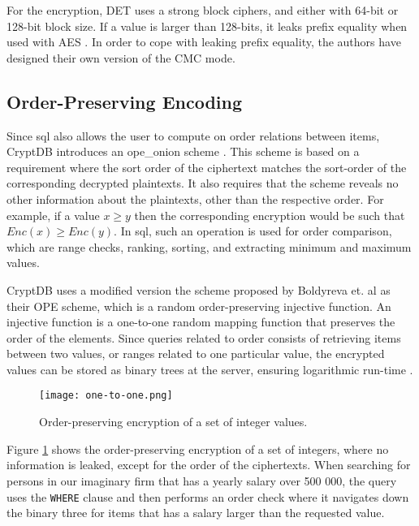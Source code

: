 \noindent
For the encryption, DET uses a strong block ciphers, and either with 64-bit or 128-bit block size. If a value is larger than 128-bits, it leaks  prefix equality when used with AES \citep{CryptDB_Main_Paper}. In order to cope with leaking prefix equality, the authors have designed their own version of the CMC mode.



\subsection{Order-Preserving Encoding}
\label{sec:ope}

Since \Gls{sql} also allows the user to compute on order relations between items, CryptDB introduces an \Gls{ope_onion} scheme \citep{CryptDB_Main_Paper}. This scheme is based on a requirement where the sort order of the ciphertext matches the sort-order of the corresponding decrypted plaintexts. It also requires that the scheme reveals no other information about the plaintexts, other than the respective order. For example, if a value $x \ge y$ then the corresponding encryption would be such that $Enc(x) \ge Enc(y)$. In \Gls{sql}, such an operation is used for order comparison, which are range checks, ranking, sorting, and extracting minimum and maximum values. 

CryptDB uses a modified version the scheme proposed by Boldyreva et. al \citep{ope_cryptdb} as their OPE scheme, which is a random order-preserving injective function. An injective function is a one-to-one random mapping function that preserves the order of the elements. Since queries related to order consists of retrieving items between two values, or ranges related to one particular value, the encrypted values can be stored as binary trees at the server, ensuring logarithmic run-time \cite{ope_cryptdb}.


\begin{figure}[h]
	\texttt{[image: one-to-one.png]}
	\caption{Order-preserving encryption of a set of integer values.}
	\label{fig:ope_function}
\end{figure}

Figure \ref{fig:ope_function} shows the order-preserving encryption of a set of integers, where no information is leaked, except for the order of the ciphertexts. When searching for persons in our imaginary firm that has a yearly salary over 500 000, the query uses the \verb!WHERE! clause and then performs an order check where it navigates down the binary three for items that has a salary larger than the requested value.

